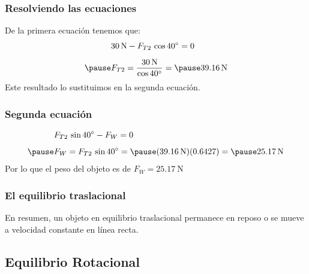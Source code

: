 \documentclass[14pt]{beamer}
\begin{document}
\begin{frame}
\frametitle{Resolviendo las ecuaciones}
De la primera ecuación tenemos que:
\pause
\begin{eqnarray*}
\begin{aligned}
&\SI{30}{\newton} - F_{T2} \, \cos \ang{40} = 0 \\[0.5em] \pause
&F_{T2} = \dfrac{\SI{30}{\newton}}{\cos \ang{40}} = \pause \SI{39.16}{\newton}
\end{aligned}
\end{eqnarray*}
\pause
Este resultado lo sustituimos en la segunda ecuación.
\end{frame}
\begin{frame}
\frametitle{Segunda ecuación}
\begin{eqnarray*}
\begin{aligned}
&F_{T2} \, \sin \ang{40} - F_{W} = 0 \\[0.5em] \pause
&F_{W} = F_{T2} \, \sin \ang{40} = \pause (\SI{39.16}{\newton})(0.6427) = \pause \SI{25.17}{\newton}
\end{aligned}
\end{eqnarray*}
\pause
Por lo que el peso del objeto es de $F_{W} = \SI{25.17}{\newton}$
\end{frame}
\begin{frame}
\frametitle{El equilibrio traslacional}
En resumen, un objeto en equilibrio traslacional permanece en reposo o se mueve a velocidad constante en línea recta.
\end{frame}

\subsection{Equilibrio Rotacional}
\end{document}
